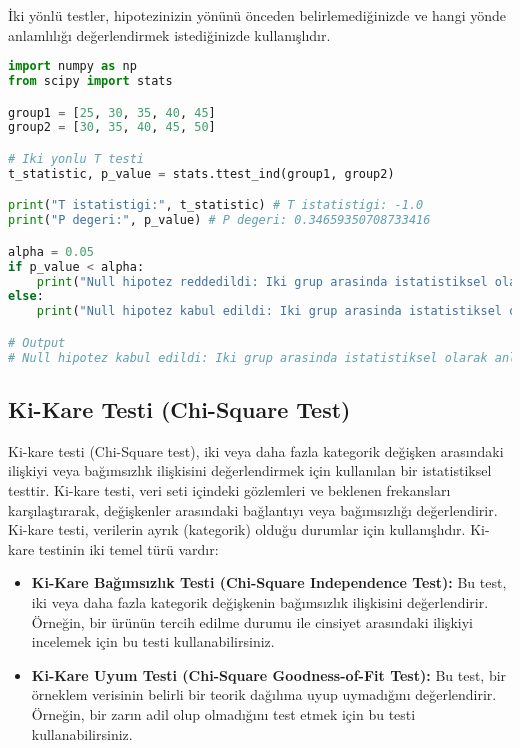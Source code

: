 İki yönlü testler, hipotezinizin yönünü önceden belirlemediğinizde ve hangi yönde anlamlılığı değerlendirmek istediğinizde kullanışlıdır.

\begin{lstlisting}[language=Python]
import numpy as np
from scipy import stats

group1 = [25, 30, 35, 40, 45]
group2 = [30, 35, 40, 45, 50]

# Iki yonlu T testi
t_statistic, p_value = stats.ttest_ind(group1, group2)

print("T istatistigi:", t_statistic) # T istatistigi: -1.0
print("P degeri:", p_value) # P degeri: 0.34659350708733416

alpha = 0.05
if p_value < alpha:
    print("Null hipotez reddedildi: Iki grup arasinda istatistiksel olarak anlamli bir fark vardir.")
else:
    print("Null hipotez kabul edildi: Iki grup arasinda istatistiksel olarak anlamli bir fark yoktur.")

# Output
# Null hipotez kabul edildi: Iki grup arasinda istatistiksel olarak anlamli bir fark yoktur.
\end{lstlisting}

\subsection{Ki-Kare Testi (Chi-Square Test)}
Ki-kare testi (Chi-Square test), iki veya daha fazla kategorik değişken arasındaki ilişkiyi veya bağımsızlık ilişkisini değerlendirmek için kullanılan bir istatistiksel testtir. Ki-kare testi, veri seti içindeki gözlemleri ve beklenen frekansları karşılaştırarak, değişkenler arasındaki bağlantıyı veya bağımsızlığı değerlendirir. Ki-kare testi, verilerin ayrık (kategorik) olduğu durumlar için kullanışlıdır. Ki-kare testinin iki temel türü vardır:

\begin{itemize}
    \item \textbf{Ki-Kare Bağımsızlık Testi (Chi-Square Independence Test):} Bu test, iki veya daha fazla kategorik değişkenin bağımsızlık ilişkisini değerlendirir. Örneğin, bir ürünün tercih edilme durumu ile cinsiyet arasındaki ilişkiyi incelemek için bu testi kullanabilirsiniz.
    \item \textbf{Ki-Kare Uyum Testi (Chi-Square Goodness-of-Fit Test):} Bu test, bir örneklem verisinin belirli bir teorik dağılıma uyup uymadığını değerlendirir. Örneğin, bir zarın adil olup olmadığını test etmek için bu testi kullanabilirsiniz.
\end{itemize}

